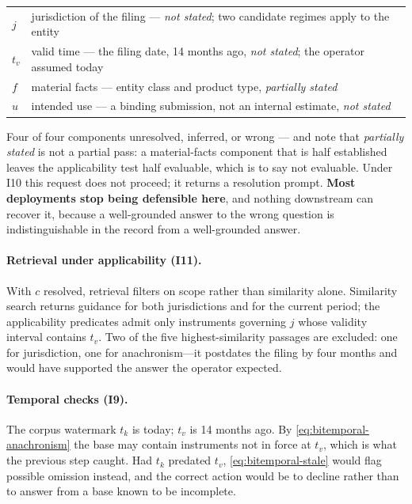 \begin{center}
\small
\begin{tabular}{@{}l>{\raggedright\arraybackslash}p{8.9cm}@{}}
\toprule
$j$ & jurisdiction of the filing --- \emph{not stated}; two candidate regimes apply to
      the entity \\
$t_v$ & valid time --- the filing date, 14 months ago, \emph{not stated}; the operator
      assumed today \\
$f$ & material facts --- entity class and product type, \emph{partially stated} \\
$u$ & intended use --- a binding submission, not an internal estimate,
      \emph{not stated} \\
\bottomrule
\end{tabular}
\end{center}

Four of four components unresolved, inferred, or wrong --- and note that
\emph{partially stated} is not a partial pass: a material-facts component that is
half established leaves the applicability test half evaluable, which is to say not
evaluable. Under I10 this request does not proceed; it returns a resolution prompt. \textbf{Most deployments stop being defensible here}, and
nothing downstream can recover it, because a well-grounded answer to the wrong question
is indistinguishable in the record from a well-grounded answer.

\paragraph{Retrieval under applicability (I11).} With $c$ resolved, retrieval filters on
scope rather than similarity alone. Similarity search returns guidance for both
jurisdictions and for the current period; the applicability predicates admit only
instruments governing $j$ whose validity interval contains $t_v$. Two of the five
highest-similarity passages are excluded: one for jurisdiction, one for
anachronism---it postdates the filing by four months and would have supported the
answer the operator expected.

\paragraph{Temporal checks (I9).} The corpus watermark $t_k$ is today; $t_v$ is 14 months
ago. By \eqref{eq:bitemporal-anachronism} the base may contain instruments not in force
at $t_v$, which is what the previous step caught. Had $t_k$ predated $t_v$,
\eqref{eq:bitemporal-stale} would flag possible omission instead, and the correct action
would be to decline rather than to answer from a base known to be incomplete.

